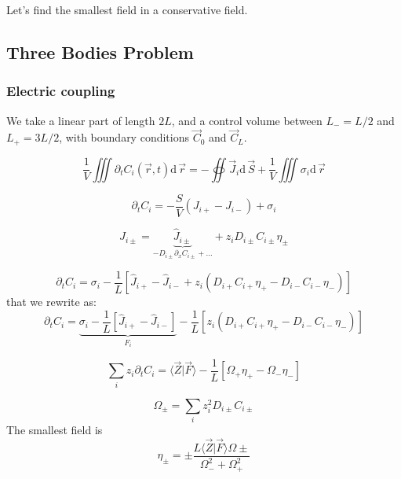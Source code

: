\documentclass[aps,12pt]{revtex4}
\begin{document}
Let's find the smallest field in a conservative field.

\subsection{Three Bodies Problem}

\subsubsection{Electric coupling}
We take a linear part of length $2L$, and a control volume between $L_-=L/2$ and $L_+=3L/2$,
with boundary conditions $\vec C_0$ and $\vec C_L$.

\begin{equation}
	\dfrac{1}{V} \iiint \partial_t C_i(\vec r,t)  \mathrm{d}\, \vec r
	= - \oiint  	\vec{J}_i \mathrm{d}\, \vec S + \dfrac{1}{V} \iiint \sigma_i \mathrm{d}\, \vec r
\end{equation}
 
\begin{equation}
	\partial_t C_i = -\dfrac{S}{V}(J_{i+}-J_{i-}) + \sigma_i
\end{equation}

\begin{equation}
	J_{i\pm} = \underbrace{\hat J_{i\pm}}_{-D_{i\pm} \partial_x C_{i\pm}+\ldots} + z_i D_{i\pm} C_{i\pm} \eta_\pm
\end{equation}

\begin{equation}
	\partial_t C_i = \sigma_i -\dfrac{1}{L} \left[ \hat J_{i+}- \hat J_{i-} + z_i (D_{i+} C_{i+} \eta_+ - D_{i-}C_{i-} \eta_-) \right] 
\end{equation}
that we rewrite as:
\begin{equation}
	\partial_t C_i =
	 \underbrace{\sigma_i -\dfrac{1}{L} \left[ \hat J_{i+}- \hat J_{i-} \right]}_{F_i} 
	 - \dfrac{1}{L}  \left[ z_i (D_{i+} C_{i+} \eta_+ - D_{i-}C_{i-} \eta_-)\right] 
\end{equation}


\begin{equation}
	\sum_i z_i \partial_t C_i =  \langle \vec Z \vert \vec F \rangle - \dfrac{1}{L} \left[ \Omega_+ \eta_{+} - \Omega_- \eta_-\right]
\end{equation}

\begin{equation}
	\Omega_\pm = \sum_i z_i^2 D_{i\pm} C_{i\pm}
\end{equation}
The smallest field is 
\begin{equation}
	\eta_\pm = \pm \dfrac{L \langle \vec Z \vert \vec F \rangle \Omega\pm}{\Omega_-^2+\Omega_+^2}
\end{equation}
\end{document}
